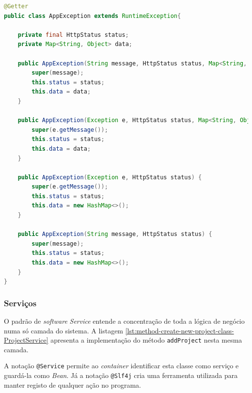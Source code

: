 \begin{lstlisting}[language=Java, caption={Exceção \textit{AppException}}, label={lst:exception-AppException}]
@Getter
public class AppException extends RuntimeException{

    private final HttpStatus status;
    private Map<String, Object> data;

    public AppException(String message, HttpStatus status, Map<String, Object> data) {
        super(message);
        this.status = status;
        this.data = data;
    }

    public AppException(Exception e, HttpStatus status, Map<String, Object> data) {
        super(e.getMessage());
        this.status = status;
        this.data = data;
    }

    public AppException(Exception e, HttpStatus status) {
        super(e.getMessage());
        this.status = status;
        this.data = new HashMap<>();
    }

    public AppException(String message, HttpStatus status) {
        super(message);
        this.status = status;
        this.data = new HashMap<>();
    }
}
\end{lstlisting}







\subsubsection{Serviços}

O padrão de \textit{software} \textit{Service} entende a concentração de toda a lógica de negócio numa só camada do sistema. A listagem \ref{lst:method-create-new-project-class-ProjectService} apresenta a implementação do método \lstinline|addProject| nesta mesma camada.

A notação \lstinline|@Service| permite ao  \textit{container} identificar esta classe como serviço e guardá-la como \textit{Bean}. Já a notação \lstinline|@Slf4j| cria uma ferramenta utilizada para manter registo de qualquer ação no programa. 

